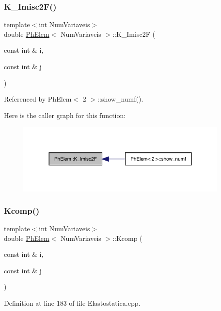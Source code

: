 \subsubsection{\texorpdfstring{K\+\_\+\+Imisc2\+F()}{K\_Imisc2F()}}
{\footnotesize\ttfamily template$<$int Num\+Variaveis$>$ \\
double \hyperlink{classPhElem}{Ph\+Elem}$<$ Num\+Variaveis $>$\+::K\+\_\+\+Imisc2F (\begin{DoxyParamCaption}\item[{const int \&}]{i,  }\item[{const int \&}]{j }\end{DoxyParamCaption})}



Referenced by Ph\+Elem$<$ 2 $>$\+::show\+\_\+numf().

Here is the caller graph for this function\+:
\nopagebreak
\begin{figure}[H]
\begin{center}
\leavevmode
\includegraphics[width=300pt]{classPhElem_a3064c3377eb3f81d63f43969a3c958ee_icgraph}
\end{center}
\end{figure}
\mbox{\label{classPhElem_afdbe06fb407dc4c474b886ed219de195}} 
\subsubsection{\texorpdfstring{Kcomp()}{Kcomp()}}
{\footnotesize\ttfamily template$<$int Num\+Variaveis$>$ \\
double \hyperlink{classPhElem}{Ph\+Elem}$<$ Num\+Variaveis $>$\+::Kcomp (\begin{DoxyParamCaption}\item[{const int \&}]{i,  }\item[{const int \&}]{j }\end{DoxyParamCaption})}



Definition at line 183 of file Elastostatica.\+cpp.



